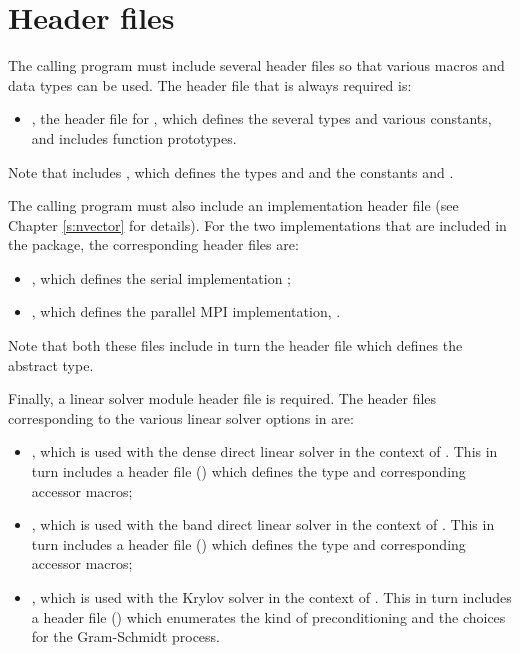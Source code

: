\section{Header files}\label{ss:header_sim}
The calling program must include several header files so that various macros
and data types can be used. The header file that is always required is:
\begin{itemize}
\item  {}, 
  the header file for {\ida}, which defines the several
  types and various constants, and includes function prototypes.
\end{itemize}
Note that  includes , 
which defines the types  and 
and the constants  and .

The calling program must also include an {\nvector} implementation header file
(see Chapter \ref{s:nvector} for details).
For the two {\nvector} implementations that are included in the {\ida} package,
the corresponding header files are:
\begin{itemize}
\item {}, 
  which defines the serial implementation {\nvecs};
\item {}, 
  which defines the parallel MPI implementation, {\nvecp}.
\end{itemize}
Note that both these files include in turn the header file  which 
defines the abstract  type. 

Finally, a linear solver module header file is required. 
The header files corresponding to the various linear solver options in {\ida} are:
\begin{itemize}
\item {}, 
  which is used with the dense direct linear solver in 
  the context of {\ida}. This in turn includes a header file ()
  which defines the  type and corresponding accessor macros; 
\item {}, 
  which is used with the band direct linear solver in the
  context of {\ida}. This in turn includes a header file ()
  which defines the  type and corresponding accessor macros;
\item {}, 
  which is used with the Krylov solver {\spgmr} in the
  context of {\ida}. This in turn includes a header file ()
  which enumerates the kind of preconditioning and the choices for the
  Gram-Schmidt process.
\end{itemize}

